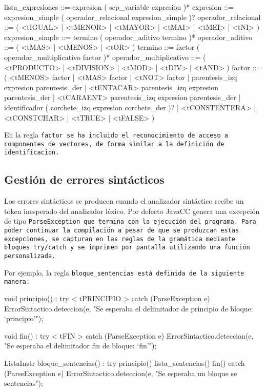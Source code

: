 \begin{codigo}
lista_expresiones ::= expresion ( sep_variable expresion )*
expresion ::= expresion_simple ( operador_relacional expresion_simple )?
operador_relacional ::= ( <tIGUAL> | <tMENOR> | <tMAYOR> | <tMAI> | <tMEI> | <tNI> )
expresion_simple ::= termino ( operador_aditivo termino )*
operador_aditivo ::= ( <tMAS> | <tMENOS> | <tOR> )
termino ::= factor ( operador_multiplicativo factor )*
operador_multiplicativo ::= ( <tPRODUCTO> | <tDIVISION> | <tMOD> | <tDIV> | <tAND> )
factor ::= ( <tMENOS> factor | <tMAS> factor | <tNOT> factor | parentesis_izq expresion parentesis_der | <tENTACAR> parentesis_izq expresion parentesis_der | <tCARAENT> parentesis_izq expresion parentesis_der | identificador ( corchete_izq expresion corchete_der )? | <tCONSTENTERA> | <tCONSTCHAR> | <tTRUE> | <tFALSE> )
\end{codigo}

En la regla \tt{factor} se ha incluido el reconocimiento de acceso a componentes de vectores, de forma similar a la definición de \tt{identificacion}.

\subsection{Gestión de errores sintácticos}

Los errores sintácticos se producen cuando el analizador sintáctico recibe un token inesperado del analizador léxico. Por defecto JavaCC genera una excepción de tipo \tt{ParseException} que termina con la ejecución del programa. Para poder continuar la compilación a pesar de que se produzcan estas excepciones, se capturan en las reglas de la gramática mediante bloques \tt{try}/\tt{catch} y se imprimen por pantalla utilizando una función personalizada.

Por ejemplo, la regla \tt{bloque\_sentencias} está definida de la siguiente manera:

\begin{codigo}
void principio() :
{}
{
  try {
    < tPRINCIPIO >
  }
  catch (ParseException e) {
    ErrorSintactico.deteccion(e, "Se esperaba el delimitador de principio de bloque: `principio'");
  }
}

void fin() :
{}
{
  try {
    < tFIN >
  }
  catch (ParseException e) {
    ErrorSintactico.deteccion(e, "Se esperaba el delimitador fin de bloque: `fin'");
  }
}

ListaInstr bloque_sentencias() :
{}
{
  try {
    principio() lista_sentencias() fin()
  }
  catch (ParseException e) {
    ErrorSintactico.deteccion(e, "Se esperaba un bloque se sentencias");
  }
}
\end{codigo}

